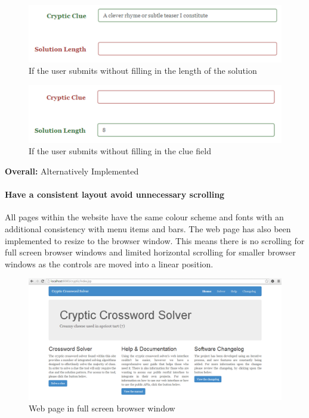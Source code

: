 \begin{figure}[H]
	\centering
	\includegraphics[keepaspectratio=true]{evidence/alert2.png}
	\caption{If the user submits without filling in the length of the solution}
\end{figure}

\begin{figure}[H]
	\centering
	\includegraphics[keepaspectratio=true]{evidence/alert3.png}
	\caption{If the user submits without filling in the clue field}
\end{figure}

{\bf Overall:} Alternatively Implemented

\paragraph{Have a consistent layout avoid unnecessary scrolling}
    All pages within the website have the same colour scheme and fonts 
with an additional consistency with menu items and bars. The web page 
has also been implemented to resize to the browser window. This means 
there is no scrolling for full screen browser windows and limited horizontal 
scrolling for smaller browser windows as the controls are moved into a linear 
position. 

\begin{figure}[H]
	\centering
	\includegraphics[keepaspectratio=true,scale=0.4]{evidence/scrolling.png}
	\caption{Web page in full screen browser window}
\end{figure}

